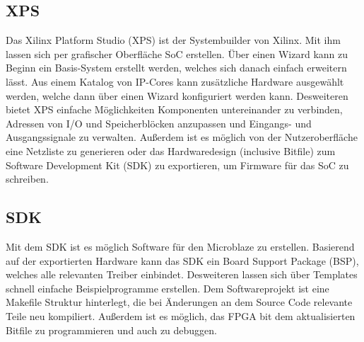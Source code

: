 \subsection{XPS}
Das Xilinx Platform Studio (XPS) ist der Systembuilder von Xilinx. Mit ihm lassen sich per grafischer Oberfläche SoC erstellen. Über einen Wizard kann zu Beginn ein Basis-System erstellt werden, welches sich danach einfach erweitern lässt. Aus einem Katalog von IP-Cores kann zusätzliche Hardware ausgewählt werden, welche dann über einen Wizard konfiguriert werden kann. Desweiteren bietet XPS einfache Möglichkeiten Komponenten untereinander zu verbinden, Adressen von I/O und Speicherblöcken anzupassen und Eingangs- und Ausgangssignale zu verwalten. Außerdem ist es möglich von der Nutzeroberfläche eine Netzliste zu generieren oder das Hardwaredesign (inclusive Bitfile) zum Software Development Kit (SDK) zu exportieren, um Firmware für das SoC zu schreiben.
\subsection{SDK}
Mit dem SDK ist es möglich Software für den Microblaze zu erstellen. Basierend auf der exportierten Hardware kann das SDK ein Board Support Package (BSP), welches alle relevanten Treiber einbindet. Desweiteren lassen sich über Templates schnell einfache Beispielprogramme erstellen. Dem Softwareprojekt ist eine Makefile Struktur hinterlegt, die bei Änderungen an dem Source Code relevante Teile neu kompiliert. Außerdem ist es möglich, das FPGA bit dem aktualisierten Bitfile zu programmieren und auch zu debuggen.

